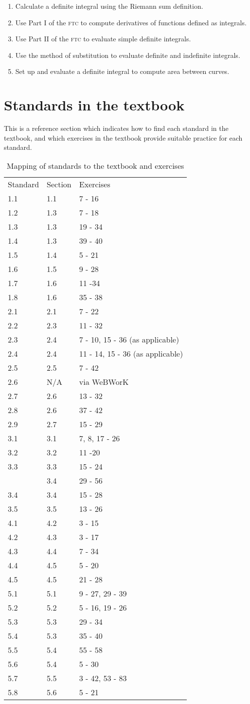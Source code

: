 \documentclass[10pt,]{article}
\newcommand{\initialism}[1]{\textsc{\MakeLowercase{#1}}}
\newcommand{\hrulethin}  {\noalign{\hrule height 0.04em}}
\begin{document}
\begin{itemize}[label=]
\begin{enumerate}[label=\arabic*)]
\item\hypertarget{li-73}{}Calculate a definite integral using the Riemann sum definition.%
\item\hypertarget{li-74}{}Use Part I of the \initialism{FTC} to compute derivatives of functions defined as integrals.%
\item\hypertarget{li-75}{}Use Part II of the \initialism{FTC} to evaluate simple definite integrals.%
\item\hypertarget{li-76}{}Use the method of substitution to evaluate definite and indefinite integrals.%
\item\hypertarget{li-77}{}Set up and evaluate a definite integral to compute area between curves.%
\end{enumerate}
%
\end{itemize}
%
%
%
\typeout{************************************************}
\typeout{************************************************}
%
\pagebreak
\section[{Standards in the textbook}]{Standards in the textbook}\label{section-mapping}
\hypertarget{p-57}{}%
This is a reference section which indicates how to find each standard in the textbook, and which exercises in the textbook provide suitable practice for each standard.%
\begin{table}
\centering
\begin{tabular}{lll}
Standard&Section&Exercises\tabularnewline\hrulethin
1.1&1.1&7 - 16\tabularnewline[0pt]
1.2&1.3&7 - 18\tabularnewline[0pt]
1.3&1.3&19 - 34\tabularnewline[0pt]
1.4&1.3&39 - 40\tabularnewline[0pt]
1.5&1.4&5 - 21\tabularnewline[0pt]
1.6&1.5&9 - 28\tabularnewline[0pt]
1.7&1.6&11 -34\tabularnewline[0pt]
1.8&1.6&35 - 38\tabularnewline[0pt]
2.1&2.1&7 - 22\tabularnewline[0pt]
2.2&2.3&11 - 32\tabularnewline[0pt]
2.3&2.4&7 - 10, 15 - 36 (as applicable)\tabularnewline[0pt]
2.4&2.4&11 - 14, 15 - 36 (as applicable)\tabularnewline[0pt]
2.5&2.5&7 - 42\tabularnewline[0pt]
2.6&N/A&via WeBWorK\tabularnewline[0pt]
2.7&2.6&13 - 32\tabularnewline[0pt]
2.8&2.6&37 - 42\tabularnewline[0pt]
2.9&2.7&15 - 29\tabularnewline[0pt]
3.1&3.1&7, 8, 17 - 26\tabularnewline[0pt]
3.2&3.2&11 -20\tabularnewline[0pt]
3.3&3.3&15 - 24\tabularnewline[0pt]
&3.4&29 - 56\tabularnewline[0pt]
3.4&3.4&15 - 28\tabularnewline[0pt]
3.5&3.5&13 - 26\tabularnewline[0pt]
4.1&4.2&3 - 15\tabularnewline[0pt]
4.2&4.3&3 - 17\tabularnewline[0pt]
4.3&4.4&7 - 34\tabularnewline[0pt]
4.4&4.5&5 - 20\tabularnewline[0pt]
4.5&4.5&21 - 28\tabularnewline[0pt]
5.1&5.1&9 - 27, 29 - 39\tabularnewline[0pt]
5.2&5.2&5 - 16, 19 - 26\tabularnewline[0pt]
5.3&5.3&29 - 34\tabularnewline[0pt]
5.4&5.3&35 - 40\tabularnewline[0pt]
5.5&5.4&55 - 58\tabularnewline[0pt]
5.6&5.4&5 - 30\tabularnewline[0pt]
5.7&5.5&3 - 42, 53 - 83\tabularnewline[0pt]
5.8&5.6&5 - 21
\end{tabular}
\caption{Mapping of standards to the textbook and exercises\label{table-standards}}
\end{table}
%
%
\typeout{************************************************}
\typeout{************************************************}
%
\pagebreak
\end{document}
